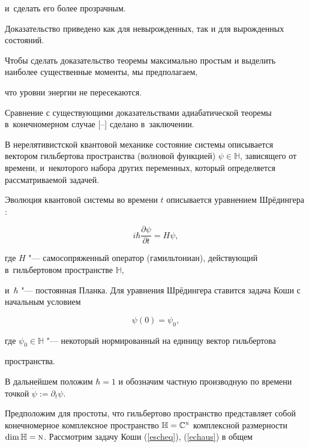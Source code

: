 и~сделать его более прозрачным. 

Доказательство приведено как для невырожденных, так и для вырожденных состояний. 

Чтобы сделать доказательство теоремы максимально простым и выделить наиболее существенные моменты, мы предполагаем,

что уровни энергии не пересекаются.



Сравнение с существующими доказательствами адиабатической теоремы в~конечномерном случае [--] сделано в~заключении.



В нерелятивистской квантовой механике состояние системы описывается вектором гильбертова пространства (волновой функцией) $\psi\in\mathbb H$, зависящего от времени, и~некоторого набора других переменных, который определяется рассматриваемой задачей. 

Эволюция квантовой системы во времени $t$ описывается уравнением Шрёдингера \cite{Schrod26A,Schrod26B}:

\begin{equation}                                                  

\label{escheq}

  i\hbar\frac{\partial  \psi}{\partial   t}=H\psi,

\end{equation}

где $H$ "--- самосопряженный оператор (гамильтониан), действующий в~гильбертовом пространстве $\mathbb H$, 

и~$\hbar$ "--- постоянная Планка. Для уравнения Шрёдингера ставится задача Коши с начальным условием

\begin{equation}                                                  

\label{echaus}

  \psi(0)=\psi_0,

\end{equation}

где $\psi_0\in\mathbb H$ "--- некоторый нормированный на единицу вектор гильбертова

пространства.



В дальнейшем положим $\hbar=1$ и обозначим частную производную по времени точкой $\dot\psi:=\partial _t\psi$.



Предположим для простоты, что гильбертово пространство представляет собой конечномерное комплексное пространство $\mathbb H={\mathbb C}^{\textsc{n}}$ комплексной размерности $\dim\mathbb H={\textsc{n}}$. Рассмотрим задачу Коши (\ref{escheq}), (\ref{echaus}) в общем

